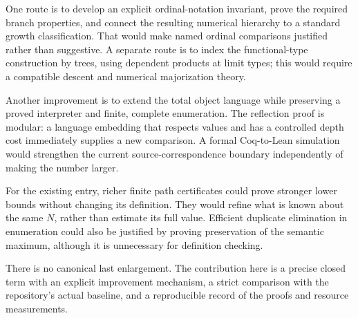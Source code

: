 One route is to develop an explicit ordinal-notation invariant,
prove the required branch properties, and connect the resulting
numerical hierarchy to a standard growth classification. That
would make named ordinal comparisons justified rather than
suggestive. A separate route is to index the functional-type
construction by trees, using dependent products at limit types;
this would require a compatible descent and numerical
majorization theory.

Another improvement is to extend the total object language while
preserving a proved interpreter and finite, complete enumeration.
The reflection proof is modular: a language embedding that respects
values and has a controlled depth cost immediately supplies a
new comparison. A formal Coq-to-Lean simulation would strengthen
the current source-correspondence boundary independently of
making the number larger.

For the existing entry, richer finite path certificates could
prove stronger lower bounds without changing its definition.
They would refine what is known about the same \(N\), rather
than estimate its full value. Efficient duplicate elimination
in enumeration could also be justified by proving preservation
of the semantic maximum, although it is unnecessary for
definition checking.

There is no canonical last enlargement. The contribution here is
a precise closed term with an explicit improvement mechanism,
a strict comparison with the repository's actual baseline, and
a reproducible record of the proofs and resource measurements.

